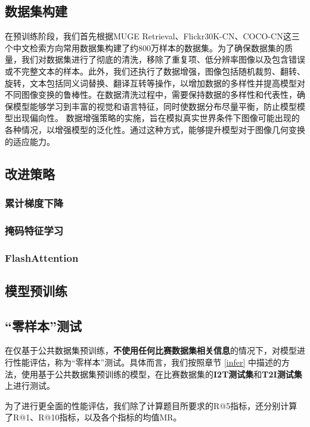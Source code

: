\documentclass[a4paper]{zreport}
\begin{document}
{{{\subsection{数据集构建}
在预训练阶段，我们首先根据MUGE Retrieval、Flickr30K-CN、COCO-CN这三个中文检索方向常用数据集构建了约800万样本的数据集。为了确保数据集的质量，我们对数据集进行了彻底的清洗，移除了重复项、低分辨率图像以及包含错误或不完整文本的样本。此外，我们还执行了数据增强，图像包括随机裁剪、翻转、旋转，文本包括同义词替换、翻译互转等操作，以增加数据的多样性并提高模型对不同图像变换的鲁棒性。在数据清洗过程中，需要保持数据的多样性和代表性，确保模型能够学习到丰富的视觉和语言特征，同时使数据分布尽量平衡，防止模型模型出现偏向性。
数据增强策略的实施，旨在模拟真实世界条件下图像可能出现的各种情况，以增强模型的泛化性。通过这种方式，能够提升模型对于图像几何变换的适应能力。


\subsection{改进策略}

\subsubsection{累计梯度下降}

\subsubsection{掩码特征学习}

\subsubsection{FlashAttention}

\subsection{模型预训练}



\subsection{“零样本”测试}

在仅基于公共数据集预训练，\textbf{不使用任何比赛数据集相关信息}的情况下，对模型进行性能评估，称为“零样本”测试。具体而言，我们按照章节 \ref{infer} 中描述的方法，使用基于公共数据集预训练的模型，在比赛数据集的\textbf{I2T测试集}和\textbf{T2I测试集}上进行测试。

为了进行更全面的性能评估，我们除了计算题目所要求的R@5指标，还分别计算了R@1、R@10指标，以及各个指标的均值MR。

}}}
\end{document}
